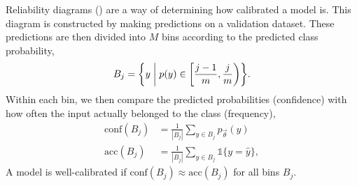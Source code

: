 Reliability diagrams () are a way of determining
how calibrated a model is. This diagram is constructed by making predictions on
a validation dataset. These predictions are then divided into $M$ bins
according to the predicted class probability, \[
  B_j = \lft\{ y \; \middle| \; p(y) \in \lft[ \frac{j-1}{m}, \frac{j}{m} \rgt) \rgt\}
.\]
Within each bin, we then compare the predicted probabilities (confidence) with
how often the input actually belonged to the class (frequency),
\begin{align*}
  \mathrm{conf}(B_j) &= \frac{1}{|B_j|} \sum_{y \in B_j} p_{\vec{\theta}}(y) \\
  \mathrm{acc}(B_j) &= \frac{1}{|B_j|} \sum_{y \in B_j} \mathbb{1}\{ y = \hat{y} \}
,\end{align*}
A model is well-calibrated if $\mathrm{conf}(B_j) \approx \mathrm{acc}(B_j)$
for all bins $B_j$.

